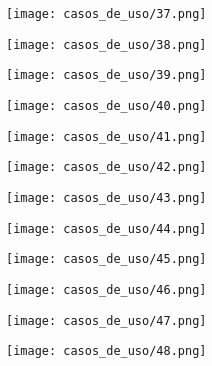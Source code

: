 \documentclass[12pt, spanish]{article}
\begin{document}
\pagebreak
\begin{centering}\texttt{[image: casos\_de\_uso/37.png]}\\[1.0 cm]\end{centering}
\pagebreak
\begin{centering}\texttt{[image: casos\_de\_uso/38.png]}\\[1.0 cm]\end{centering}
\pagebreak
\begin{centering}\texttt{[image: casos\_de\_uso/39.png]}\\[1.0 cm]\end{centering}
\pagebreak
\begin{centering}\texttt{[image: casos\_de\_uso/40.png]}\\[1.0 cm]\end{centering}
\pagebreak
\begin{centering}\texttt{[image: casos\_de\_uso/41.png]}\\[1.0 cm]\end{centering}
\pagebreak
\begin{centering}\texttt{[image: casos\_de\_uso/42.png]}\\[1.0 cm]\end{centering}
\pagebreak
\begin{centering}\texttt{[image: casos\_de\_uso/43.png]}\\[1.0 cm]\end{centering}
\pagebreak
\begin{centering}\texttt{[image: casos\_de\_uso/44.png]}\\[1.0 cm]\end{centering}
\pagebreak
\begin{centering}\texttt{[image: casos\_de\_uso/45.png]}\\[1.0 cm]\end{centering}
\pagebreak
\begin{centering}\texttt{[image: casos\_de\_uso/46.png]}\\[1.0 cm]\end{centering}
\pagebreak
\begin{centering}\texttt{[image: casos\_de\_uso/47.png]}\\[1.0 cm]\end{centering}
\pagebreak
\begin{centering}\texttt{[image: casos\_de\_uso/48.png]}\\[1.0 cm]\end{centering}
\end{document}
